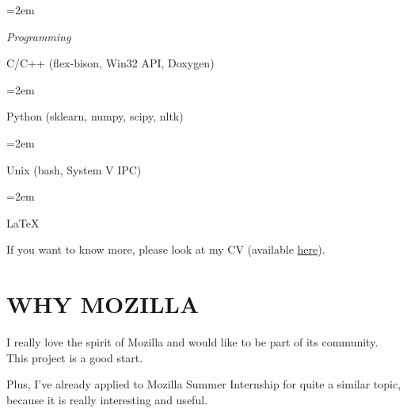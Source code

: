 \documentclass[paper=a4,fontsize=11pt]{scrartcl} %
\newlength{\spacebox}
\newcommand{\sepspace}{\vspace*{1em}}		%
\newcommand{\NewPart}[1]{\section*{\uppercase{#1}}}
\newcommand{\PersonalEntry}[2]{
	\noindent\hangindent=2em\hangafter=0 %
	\parbox{\spacebox}{        %
		\textit{#1}}		       %
	\hspace{1.5em} #2 \par}    %
\newcommand{\SkillsEntry}[2]{      %
	\noindent\hangindent=2em\hangafter=0 %
	\parbox{\spacebox}{        %
		\textit{#1}}			   %
	\hspace{1.5em} #2 \par}    %
\begin{document}
	\SkillsEntry{Programming}{C/C++ (flex-bison, Win32 API, Doxygen)}
	\SkillsEntry{}{Python (sklearn, numpy, scipy, nltk)}
	\SkillsEntry{}{Unix (bash, System V IPC)}
	\SkillsEntry{}{\LaTeX}
	
	\sepspace
	
	If you want to know more, please look at my CV (available \href{http://alexeyqu.github.io/}{here}).
	
	\NewPart{Why Mozilla}
	
	\sepspace
	
	I really love the spirit of Mozilla and would like to be part of its community. \\This project is a good start.
	
	\sepspace
	
	Plus, I've already applied to Mozilla Summer Internship for quite a similar topic, because it is really interesting and useful.
	
	
	
	
	
\end{document}
